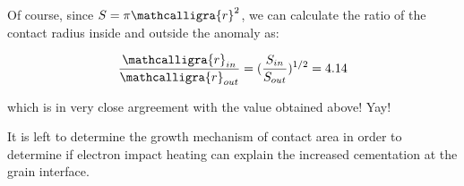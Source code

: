 \documentclass[11pt]{article} %
\newcommand{\sr}{\ensuremath{\mathcalligra{r}} \xspace}
\begin{document}
	Of course, since $S = \pi \sr^{2}$, we can calculate the ratio of the contact radius inside and outside the anomaly as:
	
	\begin{equation}
	\frac{\sr_{in}}{\sr_{out}} = ( \frac{S_{in}}{S_{out}} )^{1/2} = 4.14
	\end{equation}
	
	which is in very close argreement with the value obtained above! Yay!
	
	It is left to determine the growth mechanism of contact area in order to determine if electron impact heating can explain the increased cementation at the grain interface.  
	
\end{document}
